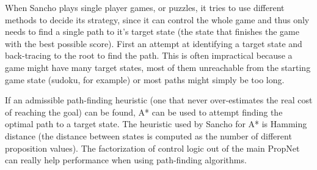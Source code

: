 When Sancho plays single player games, or puzzles, it tries to use different methods to decide its strategy, since it can control the whole game and thus only needs to find a single path to it's target state (the state that finishes the game with the best possible score).
First an attempt at identifying a target state and back-tracing to the root to find the path. This is often impractical because a game might have many target states, most of them unreachable from the starting game state (sudoku, for example) or most paths might simply be too long.

If an admissible path-finding heuristic (one that never over-estimates the real cost of reaching the goal) can be found, A* can be used to attempt finding the optimal path to a target state. The heuristic used by Sancho for A* is Hamming distance (the distance between states is computed as the number of different proposition values).
The factorization of control logic out of the main PropNet can really help performance when using path-finding algorithms.

